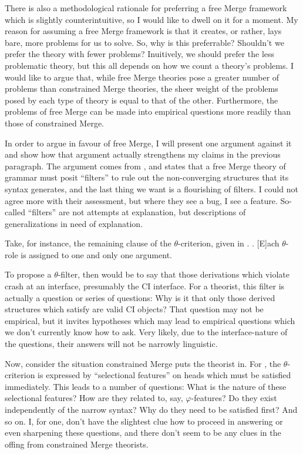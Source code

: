 \documentclass[MilwayThesis]{subfiles}
\begin{document}
There is also a methodological rationale for preferring a free Merge framework which is slightly counterintuitive, so I would like to dwell on it for a moment.
My reason for assuming a free Merge framework is that it creates, or rather, lays bare, more problems for us to solve.
So, why is this preferrable?
Shouldn't we prefer the theory with fewer problems?
Inuitively, we should prefer the less problematic theory, but this all depends on how we count a theory's problems.
I would like to argue that, while free Merge theories pose a greater number of problems than constrained Merge theories, the sheer weight of the problems posed by each type of theory is equal to that of the other.
Furthermore, the problems of free Merge can be made into empirical questions more readily than those of constrained Merge.

In order to argue in favour of free Merge, I will present one argument against it and show how that argument actually strengthens my claims in the previous paragraph.
The argument comes from \textcite{frampton2008crash}, and states that a free Merge theory of grammar must posit ``filters'' to rule out the non-converging structures that its syntax generates, and the last thing we want is a flourishing of filters.
I could not agree more with their assessment, but where they see a bug, I see a feature.
So-called ``filters'' are not attempts at explanation, but descriptions of generalizations in need of explanation.

Take, for instance, the remaining clause of the $\theta$-criterion, given in \Next.
\ex. [E]ach $\theta$-role is assigned to one and only one argument. \parencite[36]{chomsky1981lectures}

To propose a $\theta$-filter, then would be to say that those derivations which violate \Last crash at an interface, presumably the CI interface.
For a theorist, this filter is actually a question or series of questions: Why is it that only those derived structures which satisfy \Last are valid CI objects?
That question may not be empirical, but it invites hypotheses which may lead to empirical questions which we don't currently know how to ask.
Very likely, due to the interface-nature of the questions, their answers will not be narrowly linguistic.

Now, consider the situation constrained Merge puts the theorist in.
For \textcite{frampton2008crash}, the $\theta$-criterion is expressed by ``selectional features'' on heads which must be satisfied immediately.
This leads to a number of questions: What is the nature of these selectional features?
How are they related to, say, $\varphi$-features?
Do they exist independently of the narrow syntax?
Why do they need to be satisfied first?
And so on.
I, for one, don't have the slightest clue how to proceed in answering or even sharpening these questions, and there don't seem to be any clues in the offing from constrained Merge theorists.
\end{document}
